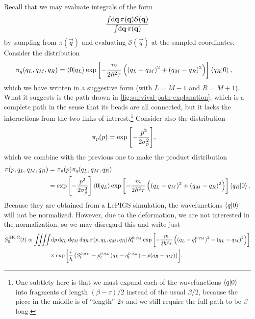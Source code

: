 Recall that we may evaluate integrals of the form
\begin{align}
	\frac{
			\int\! \dif \vec{q} \, \pi(\vec{q}) \mathcal{S}(\vec{q})
		}{
			\int\! \dif \vec{q} \, \pi(\vec{q})
		}
\end{align}
by sampling from $\pi(\vec{q})$ and evaluating $\mathcal{S}(\vec{q})$ at the sampled coordinates.
Consider the distribution
\begin{align}
	\pi_q(q_L, q_M, q_R)
	&= \braket{0 | q_L} \exp{\left[ -\frac{m}{2 \hbar^2 \tau} \left( (q_L- q_M)^2 + (q_M- q_R)^2 \right) \right]} \braket{q_R | 0},
		\label{eq:hk-dist-q}
\end{align}
which we have written in a suggestive form (with $L = M - 1$ and $R = M + 1$).
What it suggests is the path drawn in \cref{fig:survival-path-explanation}, which is a complete path in the sense that its beads are all connected, but it lacks the interactions from the two links of interest.\footnote{
	One subtlety here is that we must expand each of the wavefunctions $\braket{q | 0}$ into fragments of length $(\beta - \tau) / 2$ instead of the usual $\beta / 2$, because the piece in the middle is of ``length'' $2 \tau$ and we still require the full path to be $\beta$ long.
}
Consider also the distribution
\begin{align}
	\pi_p(p)
	&= \exp{\left[ -\frac{p^2}{2 \sigma_p^2} \right]},
\end{align}
which we combine with the previous one to make the product distribution
\begin{subequations}
\begin{align}
	\pi(p, q_L, q_M, q_R)
	&= \pi_p(p) \pi_q(q_L, q_M, q_R) \\
	&= \exp{\left[ -\frac{p^2}{2 \sigma_p^2} \right]}
		\braket{0 | q_L} \exp{\left[ -\frac{m}{2 \hbar^2 \tau} \left( (q_L- q_M)^2 + (q_M- q_R)^2 \right) \right]} \braket{q_R | 0}.
\end{align}
\end{subequations}
Because they are obtained from a LePIGS simulation, the wavefunctions $\braket{q | 0}$ will not be normalized.
However, due to the deformation, we are not interested in the normalization, so we may disregard this and write just
\begin{align}
	S_0\hkg(t)
	&\propto \iiiint\! \dif p \dif q\LL \dif q\MM \dif q\RR \,
			\pi(p, q\LL, q\MM, q\RR) R\coh{p}{q\MM}_t
			\expb{-\frac{m}{2 \hbar^2 \tau} \left( (q\LL - q\coh{p}{q\MM}_t)^2 - (q\LL - q\MM)^2 \right)} \notag \\
	&\qquad\qquad\times
			\expb{\frac{i}{\hbar} \left( S\coh{p}{q\MM}_t + p\coh{p}{q\MM}_t (q\LL - q\coh{p}{q\MM}_t) - p (q\RR - q\MM) \right)}.
\end{align}
